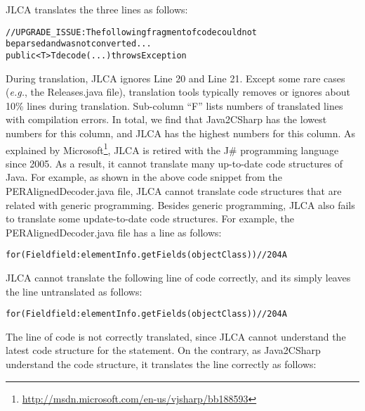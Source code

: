 JLCA translates the three lines as follows:
\begin{CodeOut}%
\begin{alltt}
//UPGRADE_ISSUE: The following fragment of code could not
   be parsed and was not converted...
public < T > T decode(...) throws Exception
\end{alltt}
\end{CodeOut}

During translation, JLCA ignores Line 20 and Line 21. Except some rare cases (\emph{e.g.}, the Releases.java file), translation tools typically removes or ignores about 10\% lines during translation. Sub-column ``F'' lists numbers of translated lines with compilation errors. In total, we find that Java2CSharp has the lowest numbers for this column, and JLCA has the highest numbers for this column. As explained by Microsoft\footnote{\url{http://msdn.microsoft.com/en-us/vjsharp/bb188593}}, JLCA is retired with the J\# programming language since 2005. As a result, it cannot translate many up-to-date code structures of Java. For example, as shown in the above code snippet from the PERAlignedDecoder.java file, JLCA cannot translate code structures that are related with generic programming. Besides generic programming, JLCA also fails to translate some update-to-date code structures. For example, the PERAlignedDecoder.java file has a line as follows:

\begin{CodeOut}%
\begin{alltt}
for(Field field:elementInfo.getFields(objectClass))//204A
\end{alltt}
\end{CodeOut}

JLCA cannot translate the following line of code correctly, and its simply leaves the line untranslated as follows:

\begin{CodeOut}%
\begin{alltt}
for(Field field:elementInfo.getFields(objectClass))//204A
\end{alltt}
\end{CodeOut}

The line of code is not correctly translated, since JLCA cannot understand the latest code structure for the  statement. On the contrary, as Java2CSharp understand the code structure, it translates the line correctly as follows:

